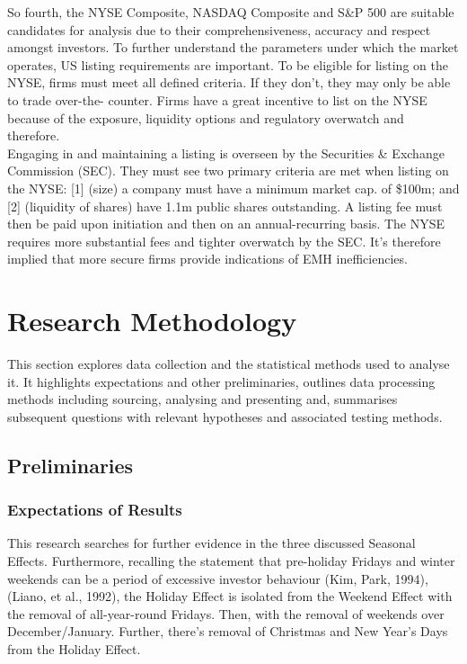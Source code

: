 \documentclass[11pt, english]{article}
\begin{document}
	So fourth, the NYSE Composite, NASDAQ Composite and S\&P 500 are suitable candidates for analysis due to their comprehensiveness, accuracy and respect amongst investors. To further understand the parameters under which the market operates, US listing requirements are important. To be eligible for listing on the NYSE, firms must meet all defined criteria. If they don’t, they may only be able to trade over-the- counter. Firms have a great incentive to list on the NYSE because of the exposure, liquidity options and regulatory overwatch and therefore.\\

	Engaging in and maintaining a listing is overseen by the Securities \& Exchange Commission (SEC). They must see two primary criteria are met when listing on the NYSE: [1] (size) a company must have a minimum market cap. of \$100m; and [2] (liquidity of shares) have 1.1m public shares outstanding. A listing fee must then be paid upon initiation and then on an annual-recurring basis. The NYSE requires more substantial fees and tighter overwatch by the SEC. It’s therefore implied that more secure firms provide indications of EMH inefficiencies.

\newpage

	\section{Research Methodology}

	This section explores data collection and the statistical methods used to analyse it. It highlights expectations and other preliminaries, outlines data processing methods including sourcing, analysing and presenting and, summarises subsequent questions with relevant hypotheses and associated testing methods.

	\subsection{Preliminaries}

		\subsubsection{Expectations of Results}

		This research searches for further evidence in the three discussed Seasonal Effects. Furthermore, recalling the statement that pre-holiday Fridays and winter weekends can be a period of excessive investor behaviour (Kim, Park, 1994), (Liano, et al., 1992), the Holiday Effect is isolated from the Weekend Effect with the removal of all-year-round Fridays. Then, with the removal of weekends over December/January. Further, there’s removal of Christmas and New Year’s Days from the Holiday Effect.\\
\end{document}
